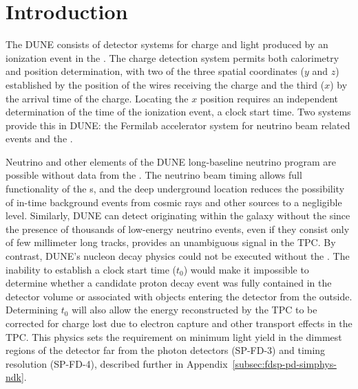 \newcommand{\tzero}{\ensuremath{t_0}\xspace}

\section{Introduction} %
\label{sec:fdsp-pd-intro}



The DUNE  consists of detector systems for charge and light produced by an ionization event in the \lartpc.  The charge detection system permits both calorimetry and position determination, with two of the three spatial coordinates ($y$ and $z$)  established by the position of the  wires receiving the charge and the third ($x$) by the arrival time of the charge.  Locating the $x$ position requires an independent determination of the time of the ionization event, a clock start time.  Two systems provide this in DUNE:  the Fermilab accelerator system for neutrino beam related events and the .  

Neutrino  and other elements of the DUNE long-baseline neutrino program are possible without data from the .  The neutrino beam timing allows full functionality of the s, and the deep underground location reduces the possibility of in-time background events from cosmic rays and other sources to a negligible level.  
Similarly, DUNE can detect  originating within the galaxy without the  since the presence of thousands of low-energy neutrino events, even if they consist only of few millimeter long tracks, provides an unambiguous signal in the TPC.
By contrast, DUNE's nucleon decay physics could not be executed without the .  The inability to establish a clock start time (\tzero) would make it impossible to determine whether a candidate proton decay event was fully contained in the detector volume or associated with objects entering the detector from the outside.  Determining \tzero will also allow the energy reconstructed by the TPC to be corrected for charge lost due to electron capture and other transport effects in the TPC. This physics sets the requirement on minimum light yield in the dimmest regions of the detector far from the photon detectors (SP-FD-3) and timing resolution (SP-FD-4), described further in Appendix~\ref{subsec:fdsp-pd-simphys-ndk}.

